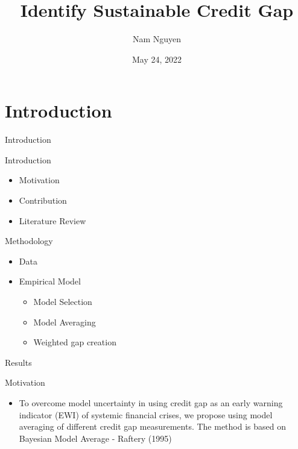 \documentclass[
  ignorenonframetext,
]{beamer}
\title{Identify Sustainable Credit Gap}
\author{Nam Nguyen}
\date{May 24, 2022}
\institute{UWM}
\providecommand{\tightlist}{%
  \setlength{\itemsep}{0pt}\setlength{\parskip}{0pt}}
\begin{document}
\frame{\titlepage}

\hypertarget{introduction}{%
\section{Introduction}\label{introduction}}

\begin{frame}{Introduction}
\begin{block}{Introduction}
\protect\hypertarget{introduction-1}{}
\begin{itemize}
\tightlist
\item
  Motivation
\item
  Contribution
\item
  Literature Review
\end{itemize}
\end{block}

\begin{block}{Methodology}
\protect\hypertarget{methodology}{}
\begin{itemize}
\tightlist
\item
  Data
\item
  Empirical Model

  \begin{itemize}
  \tightlist
  \item
    Model Selection
  \item
    Model Averaging
  \item
    Weighted gap creation
  \end{itemize}
\end{itemize}
\end{block}

\begin{block}{Results}
\protect\hypertarget{results}{}
\end{block}
\end{frame}

\begin{frame}{Motivation}
\protect\hypertarget{motivation}{}
\begin{itemize}
\tightlist
\item
  To overcome model uncertainty in using credit gap as an early warning
  indicator (EWI) of systemic financial crises, we propose using model
  averaging of different credit gap measurements. The method is based on
  Bayesian Model Average - Raftery (1995)
\end{itemize}
\end{frame}
\end{document}
